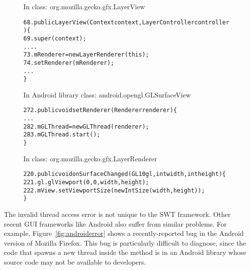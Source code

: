\begin{figure}[t]
\hspace{6mm}\small{In class: org.mozilla.gecko.gfx.LayerView}
\vspace{-2mm}
\begin{CodeOut}
\begin{alltt}
68.  public LayerView(Context context, LayerController controller) \{
69.     super(context);
        ....
73.     mRenderer = new LayerRenderer(this);
74.     setRenderer(mRenderer);
        ...
     \}
\end{alltt}
\end{CodeOut}
\hspace{6mm} \small{In Android library class: android.opengl.GLSurfaceView}
\vspace{-2mm}
\begin{CodeOut}
\begin{alltt}
272. public void setRenderer(Renderer renderer) \{
        ...
282.    mGLThread = new GLThread(renderer);
283.    mGLThread.start();   
     \}
\end{alltt}
\end{CodeOut}
 \hspace{6mm}\small{In class: org.mozilla.gecko.gfx.LayerRenderer}
\vspace{-2mm}
\begin{CodeOut}
\begin{alltt}
220. public void onSurfaceChanged(GL10 gl, int width, int height) \{
221.    gl.glViewport(0, 0, width, height);
222.    mView.setViewportSize(new IntSize(width, height));
     \}

\end{alltt}
\end{CodeOut}
\vspace*{-2.0ex}  %
\end{figure}

The invalid thread access error is not unique to the SWT framework. Other recent GUI frameworks
like Android also suffer from similar problems. For example, 
Figure~\ref{fig:androiderror} shows a recently-reported bug in the Android version of Mozilla Firefox.
This bug is particularly difficult to diagnose, 
since the code that spawns a new thread inside the  method is
in an Android library whose source code may not be available to developers.

